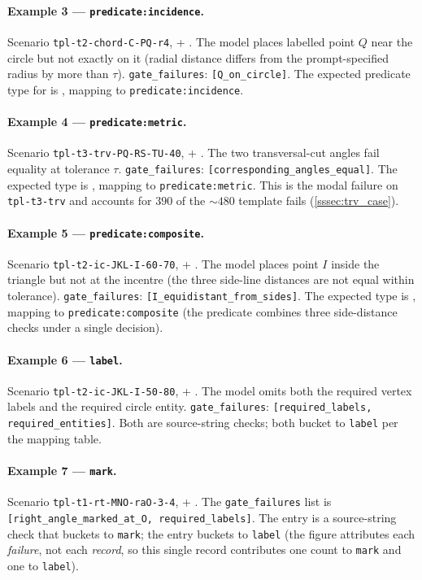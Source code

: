 \paragraph{Example 3 --- \texttt{predicate:incidence}.}
Scenario \texttt{tpl-t2-chord-C-PQ-r4}, \sonnet{} + \rawcode{}. The model places labelled point $Q$ near the circle but not exactly on it (radial distance differs from the prompt-specified radius by more than $\tau$). \texttt{gate\_failures}: \texttt{[Q\_on\_circle]}. The expected predicate type for  is , mapping to \texttt{predicate:incidence}.

\paragraph{Example 4 --- \texttt{predicate:metric}.}
Scenario \texttt{tpl-t3-trv-PQ-RS-TU-40}, \sonnet{} + \structured{}. The two transversal-cut angles fail equality at tolerance $\tau$. \texttt{gate\_failures}: \texttt{[corresponding\_angles\_equal]}. The expected type is , mapping to \texttt{predicate:metric}. This is the modal failure on \texttt{tpl-t3-trv} and accounts for $390$ of the $\sim 480$ template fails (\cref{sssec:trv_case}).

\paragraph{Example 5 --- \texttt{predicate:composite}.}
Scenario \texttt{tpl-t2-ic-JKL-I-60-70}, \sonnet{} + \rawcode{}. The model places point $I$ inside the triangle but not at the incentre (the three side-line distances are not equal within tolerance). \texttt{gate\_failures}: \texttt{[I\_equidistant\_from\_sides]}. The expected type is , mapping to \texttt{predicate:composite} (the predicate combines three side-distance checks under a single decision).

\paragraph{Example 6 --- \texttt{label}.}
Scenario \texttt{tpl-t2-ic-JKL-I-50-80}, \sonnet{} + \rawcode{}. The model omits both the required vertex labels and the required circle entity. \texttt{gate\_failures}: \texttt{[required\_labels, required\_entities]}. Both are source-string checks; both bucket to \texttt{label} per the mapping table.

\paragraph{Example 7 --- \texttt{mark}.}
Scenario \texttt{tpl-t1-rt-MNO-raO-3-4}, \geminiflash{} + \rawcode{}. The \texttt{gate\_failures} list is \texttt{[right\_angle\_marked\_at\_O, required\_labels]}. The  entry is a  source-string check that buckets to \texttt{mark}; the  entry buckets to \texttt{label} (the figure attributes each \emph{failure}, not each \emph{record}, so this single record contributes one count to \texttt{mark} and one to \texttt{label}).

